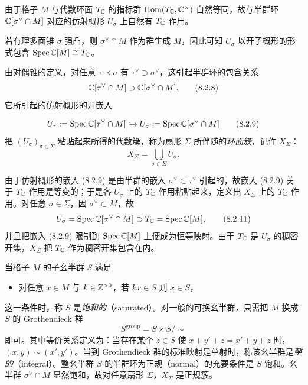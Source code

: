 由于格子 $M$ 与代数环面 $T_{\mathbb{C}}$ 的指标群 $\operatorname{Hom}(T_{\mathbb{C}},\mathbb{C}^\times)$ 自然等同，故与半群环 $\mathbb{C}[\sigma^\vee\cap M]$ 对应的仿射概形 $U_\sigma$ 上自然有 $T_{\mathbb{C}}$ 作用。

若有理多面锥 $\sigma$ 强凸，则 $\sigma^\vee\cap M$ 作为群生成 $M$，因此可知 $U_\sigma$ 以开子概形的形式包含 $\operatorname{Spec}\mathbb{C}[M]\cong T_{\mathbb{C}}$。

由对偶锥的定义，对任意 $\tau\prec\sigma$ 有 $\tau^\vee\supset\sigma^\vee$，这引起半群环的包含关系
\begin{equation}
  \mathbb{C}[\tau^\vee\cap M]\supset\mathbb{C}[\sigma^\vee\cap M]. \tag{8.2.8}
\end{equation}
它所引起的仿射概形的开嵌入

\begin{equation}
  U_\tau:=\operatorname{Spec}\mathbb{C}[\tau^\vee\cap M]\hookrightarrow U_\sigma:=\operatorname{Spec}\mathbb{C}[\sigma^\vee\cap M] \tag{8.2.9}
\end{equation}
把 $(U_\sigma)_{\sigma\in\Sigma}$ 粘贴起来所得的代数簇，称为扇形 $\Sigma$ 所伴随的\emph{环面簇}，记作 $X_\Sigma$：
\begin{equation}
  X_\Sigma=\bigcup_{\sigma\in\Sigma}U_\sigma. \tag{8.2.10}
\end{equation}

由于仿射概形的嵌入 (8.2.9) 是由半群的嵌入 $\sigma^\vee\subset\tau^\vee$ 引起的，故嵌入 (8.2.9) 关于 $T_{\mathbb{C}}$ 作用是等变的；于是各 $U_\sigma$ 上的 $T_{\mathbb{C}}$ 作用粘贴起来，定义出 $X_\Sigma$ 上的 $T_{\mathbb{C}}$ 作用。对任意 $\sigma\in\Sigma$，因 $\sigma^\vee\subset M$，故
\begin{equation}
  U_\sigma=\operatorname{Spec}\mathbb{C}[\sigma^\vee\cap M]\supset T_{\mathbb{C}}=\operatorname{Spec}\mathbb{C}[M], \tag{8.2.11}
\end{equation}
并且把嵌入 (8.2.9) 限制到 $\operatorname{Spec}\mathbb{C}[M]$ 上便成为恒等映射。由于 $T_{\mathbb{C}}$ 是 $U_\sigma$ 的稠密开集，$X_\Sigma$ 把 $T_{\mathbb{C}}$ 作为稠密开集包含在内。

当格子 $M$ 的子幺半群 $S$ 满足
\begin{itemize}
  \item 对任意 $x\in M$ 与 $k\in\mathbb{Z}^{>0}$，若 $kx\in S$ 则 $x\in S$，
\end{itemize}
这一条件时，称 $S$ 是\emph{饱和的}（saturated）。对一般的可换幺半群，只需把 $M$ 换成 $S$ 的 Grothendieck 群
\begin{equation}
  S^{\mathrm{group}}=S\times S/\!\sim \tag{8.2.12}
\end{equation}
即可。其中等价关系定义为：当存在某个 $z\in S$ 使 $x+y'+z=x'+y+z$ 时，$(x,y)\sim(x',y')$。当到 Grothendieck 群的标准映射是单射时，称该幺半群是\emph{整的}（integral）。整幺半群 $S$ 的半群环为正规（normal）的充要条件是 $S$ 饱和。幺半群 $\sigma^\vee\cap M$ 显然饱和，故对任意扇形 $\Sigma$，$X_\Sigma$ 是正规簇。

